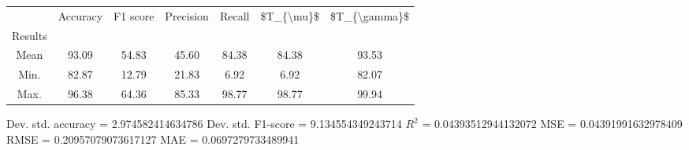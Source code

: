 \begin{tabular}{|c|c|c|c|c|c|c|}
\toprule
{} &  Accuracy &  F1 score &  Precision &  Recall &  \$T\_\{\textbackslash mu\}\$ &  \$T\_\{\textbackslash gamma\}\$ \\
Results &           &           &            &         &            &               \\
\hline
Mean    &     93.09 &     54.83 &      45.60 &   84.38 &      84.38 &         93.53 \\
Min.    &     82.87 &     12.79 &      21.83 &    6.92 &       6.92 &         82.07 \\
Max.    &     96.38 &     64.36 &      85.33 &   98.77 &      98.77 &         99.94 \\
\bottomrule
\end{tabular}

 Dev. std. accuracy = 2.974582414634786
 Dev. std. F1-score = 9.134554349243714
 $R^2$ = 0.04393512944132072
 MSE = 0.04391991632978409
 RMSE = 0.20957079073617127
 MAE = 0.0697279733489941